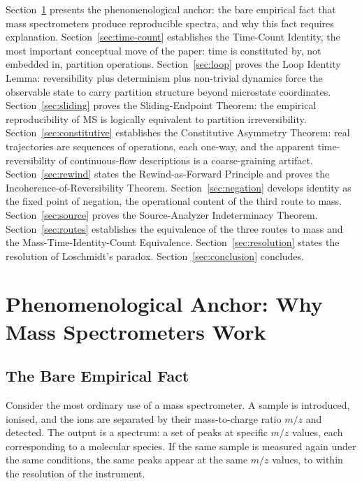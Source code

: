 \documentclass[twocolumn,10pt,a4paper]{article}
\theoremstyle{definition}
\theoremstyle{remark}
\begin{document}
Section~\ref{sec:phenomenology} presents the phenomenological anchor: the bare empirical fact that mass spectrometers produce reproducible spectra, and why this fact requires explanation. Section~\ref{sec:time-count} establishes the Time-Count Identity, the most important conceptual move of the paper: time is constituted by, not embedded in, partition operations. Section~\ref{sec:loop} proves the Loop Identity Lemma: reversibility plus determinism plus non-trivial dynamics force the observable state to carry partition structure beyond microstate coordinates. Section~\ref{sec:sliding} proves the Sliding-Endpoint Theorem: the empirical reproducibility of MS is logically equivalent to partition irreversibility. Section~\ref{sec:constitutive} establishes the Constitutive Asymmetry Theorem: real trajectories are sequences of operations, each one-way, and the apparent time-reversibility of continuous-flow descriptions is a coarse-graining artifact. Section~\ref{sec:rewind} states the Rewind-as-Forward Principle and proves the Incoherence-of-Reversibility Theorem. Section~\ref{sec:negation} develops identity as the fixed point of negation, the operational content of the third route to mass. Section~\ref{sec:source} proves the Source-Analyzer Indeterminacy Theorem. Section~\ref{sec:routes} establishes the equivalence of the three routes to mass and the Mass-Time-Identity-Count Equivalence. Section~\ref{sec:resolution} states the resolution of Loschmidt's paradox. Section~\ref{sec:conclusion} concludes.

\section{Phenomenological Anchor: Why Mass Spectrometers Work}
\label{sec:phenomenology}

\subsection{The Bare Empirical Fact}

Consider the most ordinary use of a mass spectrometer. A sample is introduced, ionised, and the ions are separated by their mass-to-charge ratio $m/z$ and detected. The output is a spectrum: a set of peaks at specific $m/z$ values, each corresponding to a molecular species. If the same sample is measured again under the same conditions, the same peaks appear at the same $m/z$ values, to within the resolution of the instrument.
\end{document}
